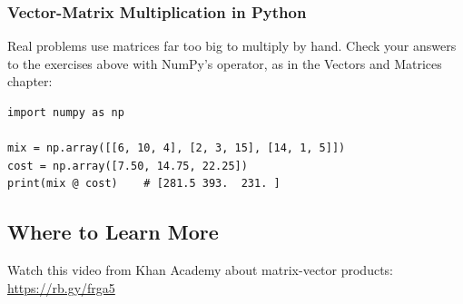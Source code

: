 \subsubsection{Vector-Matrix Multiplication in Python}
Real problems use matrices far too big to multiply by hand. Check your
answers to the exercises above with NumPy's  operator, as in
the Vectors and Matrices chapter:
\begin{verbatim}
import numpy as np

mix = np.array([[6, 10, 4], [2, 3, 15], [14, 1, 5]])
cost = np.array([7.50, 14.75, 22.25])
print(mix @ cost)    # [281.5 393.  231. ]
\end{verbatim}

\subsection{Where to Learn More}
Watch this video from Khan Academy about matrix-vector products: \url{https://rb.gy/frga5}
